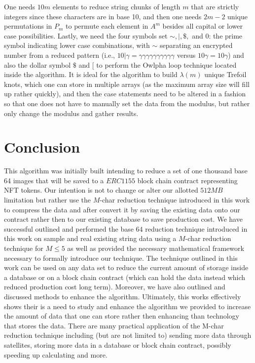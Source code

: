\documentclass[amsmath,12pt,a4paper]{amsart}
\begin{document}
One needs \( 10m \) elements to reduce string chunks of length \( m \) that are strictly integers since these characters are in base 10, and then one needs \( 2m - 2 \) unique permutations in \( P_m \) to permute each element in \( A^m \) besides all capital or lower case possibilities. Lastly, we need the four symbols set \( \sim, |, \$, \) and \( 0 \): the prime symbol indicating lower case combinations, with \( \sim \) separating an encrypted number from a reduced pattern (i.e., \( 10|\gamma = \gamma\gamma\gamma\gamma\gamma\gamma\gamma\gamma\gamma\gamma \) versus \( 10 \gamma = 10\gamma \)) and also the dollar symbol \( \$ \) and \( [ \) to perform the Owlpha loop technique located inside the algorithm. It is ideal for the algorithm to build \( \lambda(m) \) unique Trefoil knots, which one can store in multiple arrays (as the maximum array size will fill up rather quickly), and then the case statements need to be altered in a fashion so that one does not have to manually set the data from the modulus, but rather only change the modulus and gather results.

\section{Conclusion}
This algorithm was initially built intending to reduce a set of one thousand base 64 images that will be saved to a $ERC1155$ block chain contract representing NFT tokens. Our intention is not to change or alter our allotted $512MB$ limitation but rather use the $M$-char reduction technique introduced in this work to compress the data and after convert it by saving the existing data onto our contract rather then to our existing database to save production cost. We have successful outlined and performed the base 64 reduction technique introduced in this work on sample and real existing string data using a $M$-char reduction technique for $M \le 5$ as well as provided the
necessary mathematical framework necessary to formally introduce our technique. The technique outlined in this work can be used on any data set to reduce the current amount of storage inside a
database or on a block chain contract (which can hold the data instead which reduced production cost long term). Moreover, we have also outlined and discussed methods to enhance the algorithm.
Ultimately, this works effectively shows their is a need to study and enhance the algorithm we provided to increase the amount of data that one can store rather then enhancing than technology
that stores the data. There are many practical application of the M-char reduction technique including (but are not limited to) sending more data through satellites, storing more data in a
database or block chain contract, possibly speeding up calculating and more.


\end{document}
